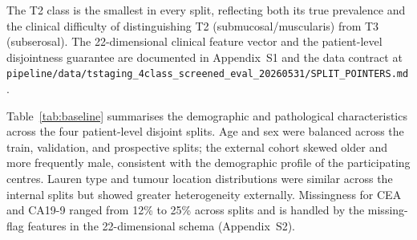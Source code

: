 \documentclass[11pt,a4paper]{article}
\begin{document}
The T2 class is the smallest in every split, reflecting both its true prevalence and the clinical difficulty of distinguishing T2 (submucosal/muscularis) from T3 (subserosal). The 22-dimensional clinical feature vector and the patient-level disjointness guarantee are documented in Appendix~S1 and the data contract at \texttt{pipeline/data/tstaging\_4class\_screened\_eval\_20260531/SPLIT\_POINTERS.md}.

Table~\ref{tab:baseline} summarises the demographic and pathological characteristics across the four patient-level disjoint splits. Age and sex were balanced across the train, validation, and prospective splits; the external cohort skewed older and more frequently male, consistent with the demographic profile of the participating centres. Lauren type and tumour location distributions were similar across the internal splits but showed greater heterogeneity externally. Missingness for CEA and CA19-9 ranged from 12\% to 25\% across splits and is handled by the missing-flag features in the 22-dimensional schema (Appendix~S2).
\end{document}
